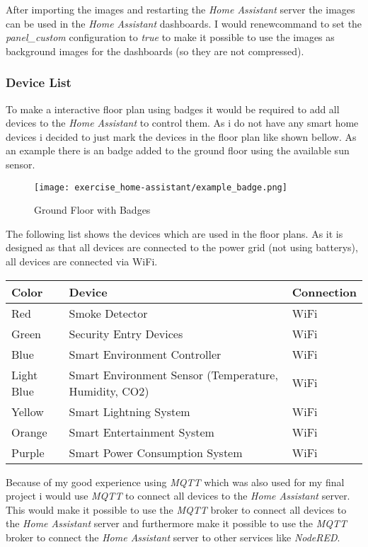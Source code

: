 After importing the images and restarting the \textit{Home Assistant} server the images can be used in the 
\textit{Home Assistant} dashboards. I would renewcommand to set the \textit{panel\_custom} configuration to 
\textit{true} to make it possible to use the images as background images for the dashboards (so they are not compressed).

\subsubsection{Device List}
To make a interactive floor plan using badges it would be required to add all devices to the \textit{Home Assistant} to 
control them. As i do not have any smart home devices i decided to just mark the devices in the floor plan like shown bellow.
As an example there is an badge added to the ground floor using the available sun sensor.

\begin{figure}[H]
    \centering
    \texttt{[image: exercise\_home-assistant/example\_badge.png]}
    \caption{Ground Floor with Badges}
    \label{fig:ground_floor_badges}
\end{figure}

The following list shows the devices which are used in the floor plans.
As it is designed as that all devices are connected to the power grid (not using batterys),  all devices are connected via 
WiFi.

\begin{table}[!ht]
  \centering
  \begin{tabular}{|l|l|l|}
  \hline
      Color & Device & Connection \\ \hline
      Red & Smoke Detector & WiFi \\ \hline
      Green & Security Entry Devices & WiFi \\ \hline
      Blue & Smart Environment Controller & WiFi \\ \hline
      Light Blue & Smart Environment Sensor (Temperature, Humidity, CO2) & WiFi \\ \hline
      Yellow & Smart Lightning System & WiFi \\ \hline
      Orange & Smart Entertainment System & WiFi \\ \hline
      Purple & Smart Power Consumption System & WiFi \\ \hline
  \end{tabular}
\end{table}

Because of my good experience using \textit{MQTT} which was also used for my final project i would use \textit{MQTT} to 
connect all devices to the \textit{Home Assistant} server. This would make it possible to use the \textit{MQTT} broker 
to connect all devices to the \textit{Home Assistant} server and furthermore make it possible to use the \textit{MQTT} 
broker to connect the \textit{Home Assistant} server to other services like \textit{Node\-RED}.

